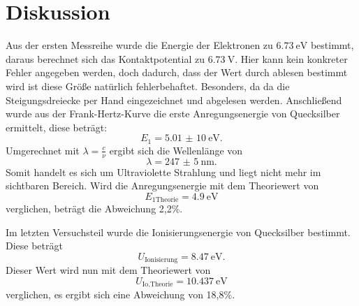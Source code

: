 \section{Diskussion}
\label{sec:Diskussion}
Aus der ersten Messreihe wurde die Energie der Elektronen zu
$\SI{6,73}{\eV}$ bestimmt, daraus berechnet sich das
Kontaktpotential zu $\SI{6,73}{\V}$.
Hier kann kein konkreter Fehler angegeben werden, doch dadurch, dass der Wert durch
ablesen bestimmt wird ist diese Größe natürlich fehlerbehaftet. Besonders, da
da die Steigungsdreiecke per Hand eingezeichnet und abgelesen werden.
Anschließend wurde aus der Frank-Hertz-Kurve die erste Anregungsenergie
von Quecksilber ermittelt, diese
beträgt:
\begin{equation}
  E_1=\SI{5,01(10)}{\eV}.
\end{equation}
Umgerechnet mit $\lambda=\frac{c}{\nu}$ ergibt sich die Wellenlänge von
\begin{equation}
  \lambda=\SI{247(5)}{\nm}.
\end{equation}
Somit handelt es sich um Ultraviolette Strahlung und liegt nicht mehr im sichtbaren Bereich.
Wird die Anregungsenergie mit dem Theoriewert von
\begin{equation}
  E_{1\text{Theorie}}=\SI{4,9}{\eV}
\end{equation}
\cite{anregung}
verglichen, beträgt die Abweichung 2,2\%.

Im letzten Versuchsteil wurde die Ionisierungsenergie von Quecksilber
bestimmt. Diese beträgt
\begin{equation}
  U_{\text{Ionisierung}}=\SI{8,47}{\eV}.
\end{equation}
Dieser Wert wird nun mit dem Theoriewert von
\begin{equation}
  U_{\text{Io,Theorie}}=\SI{10,437}{\eV}
\end{equation}
\cite{ionisierung}
verglichen, es ergibt sich eine Abweichung von 18,8\%.
